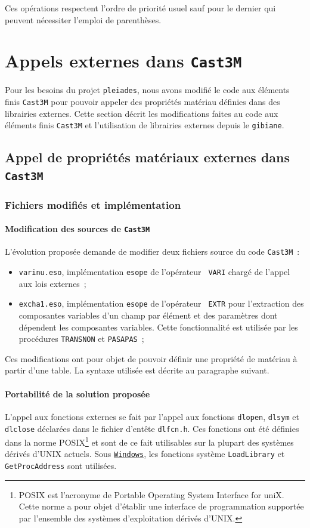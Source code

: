 \documentclass[rectoverso,pleiades,pstricks,leqno,anti]{texmf/note_technique_2010}
\newcommand{\pleiades}{\texttt{pleiades}}
\newcommand{\castem}{\texttt{Cast3M}}
\newcommand{\windows}{\href{http://www.microsoft.com/france/windows/default.mspx}{\texttt{Windows}}}
\begin{document}
Ces opérations respectent l'ordre de priorité usuel sauf pour le
dernier qui peuvent nécessiter l'emploi de parenthèses.


\clearpage
\newpage
\section{Appels externes dans \castem{}}

Pour les besoins du projet \pleiades{}, nous avons modifié le code aux
éléments finis \castem{} pour pouvoir appeler des propriétés matériau
définies dans des librairies externes. Cette section décrit les
modifications faites au code aux éléments finis \castem{} et
l'utilisation de librairies externes depuis le {\tt gibiane}.

\subsection{Appel de propriétés matériaux externes dans \castem{}}
\label{sec:castem:materialproperties}

\subsubsection{Fichiers modifiés et implémentation}

\paragraph{Modification des sources de \castem{}} L'évolution proposée
demande de modifier deux fichiers source du code \castem{}~:
\begin{itemize}
  \item {\tt varinu.eso}, implémentation {\tt esope} de l'opérateur {\tt
    VARI} chargé de l'appel aux lois externes~;
  \item {\tt excha1.eso}, implémentation {\tt esope} de l'opérateur {\tt
    EXTR} pour l'extraction des composantes variables d'un champ par
  élément et des paramètres dont dépendent les composantes variables.
  Cette fonctionnalité est utilisée par les procédures {\tt TRANSNON} et
  {\tt PASAPAS}~;
\end{itemize}
Ces modifications ont pour objet de pouvoir définir une propriété de
matériau à partir d'une table. La syntaxe utilisée est décrite au
paragraphe suivant.

\paragraph{Portabilité de la solution proposée} L'appel aux fonctions
externes se fait par l'appel aux fonctions {\tt dlopen}, {\tt dlsym} et
{\tt dlclose} déclarées dans le fichier d'entête {\tt dlfcn.h}. Ces
fonctions ont été définies dans la norme POSIX\footnote{POSIX est
  l'acronyme de Portable Operating System Interface for uniX. Cette
  norme a pour objet d'établir une interface de programmation supportée
  par l'ensemble des systèmes d'exploitation dérivés d'UNIX.} et sont de
ce fait utilisables sur la plupart des systèmes dérivés d'UNIX actuels.
Sous \windows{}, les fonctions système {\tt Load\-Library} et {\tt
  Get\-Proc\-Address} sont utilisées.
\end{document}
